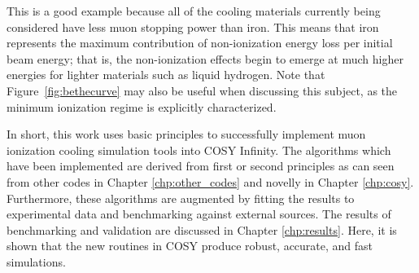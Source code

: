 This is a good example because all of the cooling materials currently being considered have less muon stopping power than iron. This means that iron represents the maximum contribution of non-ionization energy loss per initial beam energy; that is, the non-ionization effects begin to emerge at much higher energies for lighter materials such as liquid hydrogen. Note that Figure~\ref{fig:bethecurve} may also be useful when discussing this subject, as the minimum ionization regime is explicitly characterized.

\par

In short, this work uses basic principles to successfully implement muon ionization cooling simulation tools into COSY Infinity. The algorithms which have been implemented are derived from first or second principles as can seen from other codes in Chapter \ref{chp:other_codes} and novelly in Chapter \ref{chp:cosy}. Furthermore, these algorithms are augmented by fitting the results to experimental data and benchmarking against external sources. The results of benchmarking and validation are discussed in Chapter \ref{chp:results}. Here, it is shown that the new routines in COSY produce robust, accurate, and fast simulations.
